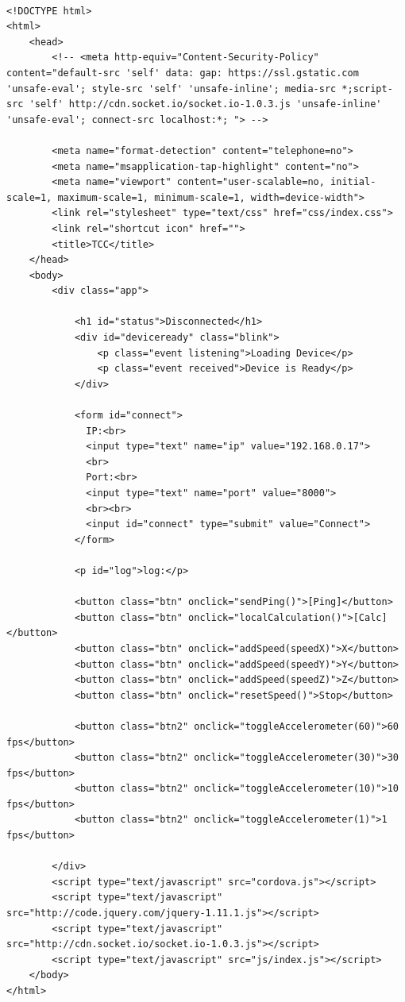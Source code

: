 \documentclass[a4paper,12pt]{article}
\begin{document}
\begin{lstlisting}[language=HTML5]

<!DOCTYPE html>
<html>
    <head>
        <!-- <meta http-equiv="Content-Security-Policy" content="default-src 'self' data: gap: https://ssl.gstatic.com 'unsafe-eval'; style-src 'self' 'unsafe-inline'; media-src *;script-src 'self' http://cdn.socket.io/socket.io-1.0.3.js 'unsafe-inline' 'unsafe-eval'; connect-src localhost:*; "> -->

        <meta name="format-detection" content="telephone=no">
        <meta name="msapplication-tap-highlight" content="no">
        <meta name="viewport" content="user-scalable=no, initial-scale=1, maximum-scale=1, minimum-scale=1, width=device-width">
        <link rel="stylesheet" type="text/css" href="css/index.css">
        <link rel="shortcut icon" href="">
        <title>TCC</title>
    </head>
    <body>
        <div class="app">

            <h1 id="status">Disconnected</h1>
            <div id="deviceready" class="blink">
                <p class="event listening">Loading Device</p>
                <p class="event received">Device is Ready</p>
            </div>

            <form id="connect">
              IP:<br>
              <input type="text" name="ip" value="192.168.0.17">
              <br>
              Port:<br>
              <input type="text" name="port" value="8000">
              <br><br>
              <input id="connect" type="submit" value="Connect">
            </form>

            <p id="log">log:</p>

            <button class="btn" onclick="sendPing()">[Ping]</button>
            <button class="btn" onclick="localCalculation()">[Calc]</button>
            <button class="btn" onclick="addSpeed(speedX)">X</button>
            <button class="btn" onclick="addSpeed(speedY)">Y</button>
            <button class="btn" onclick="addSpeed(speedZ)">Z</button>
            <button class="btn" onclick="resetSpeed()">Stop</button>

            <button class="btn2" onclick="toggleAccelerometer(60)">60 fps</button>
            <button class="btn2" onclick="toggleAccelerometer(30)">30 fps</button>
            <button class="btn2" onclick="toggleAccelerometer(10)">10 fps</button>
            <button class="btn2" onclick="toggleAccelerometer(1)">1 fps</button>

        </div>
        <script type="text/javascript" src="cordova.js"></script>
        <script type="text/javascript" src="http://code.jquery.com/jquery-1.11.1.js"></script>
        <script type="text/javascript" src="http://cdn.socket.io/socket.io-1.0.3.js"></script>
        <script type="text/javascript" src="js/index.js"></script>
    </body>
</html>
\end{lstlisting}
\end{document}
